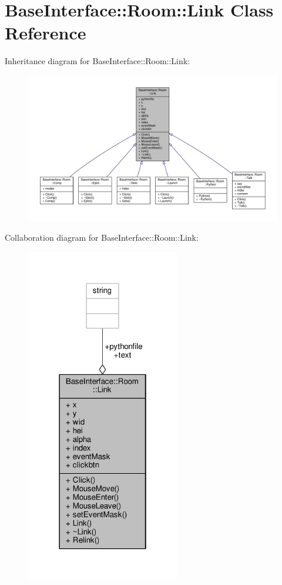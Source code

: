 \hypertarget{classBaseInterface_1_1Room_1_1Link}{}\section{Base\+Interface\+:\+:Room\+:\+:Link Class Reference}
\label{classBaseInterface_1_1Room_1_1Link}


Inheritance diagram for Base\+Interface\+:\+:Room\+:\+:Link\+:
\nopagebreak
\begin{figure}[H]
\begin{center}
\leavevmode
\includegraphics[width=350pt]{dd/d81/classBaseInterface_1_1Room_1_1Link__inherit__graph}
\end{center}
\end{figure}


Collaboration diagram for Base\+Interface\+:\+:Room\+:\+:Link\+:
\nopagebreak
\begin{figure}[H]
\begin{center}
\leavevmode
\includegraphics[width=190pt]{d4/df9/classBaseInterface_1_1Room_1_1Link__coll__graph}
\end{center}
\end{figure}
